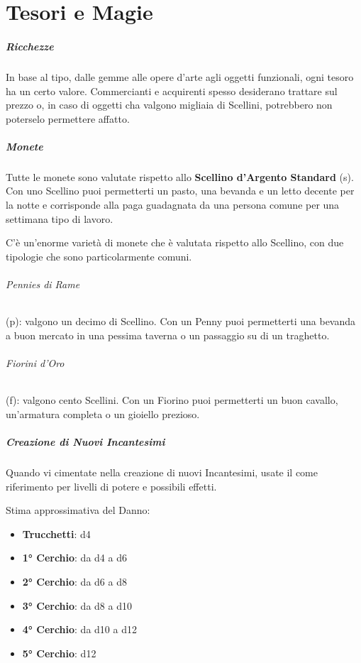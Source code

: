 \documentclass[itdr]{subfiles}
\begin{document}
\chapter{Tesori e Magie}
\label{ch:tesori_e_magie}

\paragraph{Ricchezze}
In base al tipo, dalle gemme alle opere d'arte agli oggetti funzionali, ogni tesoro ha un certo valore. Commercianti e acquirenti spesso desiderano trattare sul prezzo o, in caso di oggetti cha valgono migliaia di Scellini, potrebbero non poterselo permettere affatto.

\paragraph{Monete}
Tutte le monete sono valutate rispetto allo \textbf{Scellino d'Argento Standard} (s). Con uno Scellino puoi permetterti un pasto, una bevanda e un letto decente per la notte e corrisponde alla paga guadagnata da una persona comune per una settimana tipo di lavoro.

C'è un'enorme varietà di monete che è valutata rispetto allo Scellino, con due tipologie che sono particolarmente comuni.

\subparagraph{Pennies di Rame} (p): valgono un decimo di Scellino. Con un Penny puoi permetterti una bevanda a buon mercato in una pessima taverna o un passaggio su di un traghetto.

\subparagraph{Fiorini d'Oro} (f): valgono cento Scellini. Con un Fiorino puoi permetterti un buon cavallo, un'armatura completa o un gioiello prezioso.

\paragraph{Creazione di Nuovi Incantesimi}
Quando vi cimentate nella creazione di nuovi Incantesimi, usate il \textbf{} come riferimento per livelli di potere e possibili effetti.

Stima approssimativa del Danno:
\begin{itemize}
	\item \textbf{Trucchetti}: d4
	\item \textbf{1° Cerchio}: da d4 a d6
	\item \textbf{2° Cerchio}: da d6 a d8
	\item \textbf{3° Cerchio}: da d8 a d10
	\item \textbf{4° Cerchio}: da d10 a d12
	\item \textbf{5° Cerchio}: d12
\end{itemize}
\end{document}
